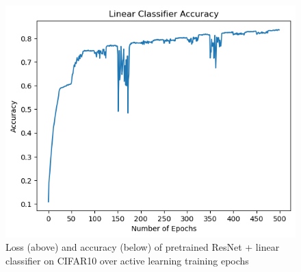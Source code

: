 \documentclass{article}
\begin{document}
\begin{flushleft}
\begin{figure}[h]
    \includegraphics[scale=0.65]{lcsl_500_20_50_acc}
    \caption{Loss (above) and accuracy (below) of pretrained ResNet + linear classifier on CIFAR10 over active learning training epochs}
\end{figure}
\end{flushleft}
\end{document}
